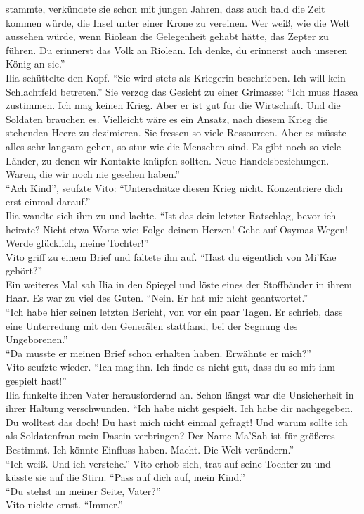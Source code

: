 stammte, verkündete sie schon mit jungen Jahren, dass auch bald die Zeit kommen würde, die Insel 
unter einer Krone zu vereinen. Wer weiß, wie die Welt aussehen würde, wenn Riolean die Gelegenheit 
gehabt hätte, das Zepter zu führen. Du erinnerst das Volk an Riolean. Ich denke, du erinnerst auch 
unseren König an sie.''\\
Ilia schüttelte den Kopf. ``Sie wird stets als Kriegerin beschrieben. Ich will kein Schlachtfeld 
betreten.'' Sie verzog das Gesicht zu einer Grimasse: ``Ich muss Hasea zustimmen. Ich mag keinen 
Krieg. Aber er ist gut für die Wirtschaft. Und die Soldaten brauchen es. Vielleicht wäre es ein 
Ansatz, nach diesem Krieg die stehenden Heere zu dezimieren. Sie fressen so viele Ressourcen. Aber 
es müsste alles sehr langsam gehen, so stur wie die Menschen sind. Es gibt noch so viele Länder, zu 
denen wir Kontakte knüpfen sollten. Neue Handelsbeziehungen. Waren, die wir noch nie gesehen 
haben.''\\
``Ach Kind'', seufzte Vito: ``Unterschätze diesen Krieg nicht. Konzentriere dich erst einmal 
darauf.''\\
Ilia wandte sich ihm zu und lachte. ``Ist das dein letzter Ratschlag, bevor ich heirate? Nicht 
etwa Worte wie: Folge deinem Herzen! Gehe auf Osymas Wegen! Werde glücklich, meine Tochter!''\\
Vito griff zu einem Brief und faltete ihn auf. ``Hast du eigentlich von Mi'Kae gehört?''\\
Ein weiteres Mal sah Ilia in den Spiegel und löste eines der Stoffbänder in ihrem Haar. 
Es war zu viel des Guten. ``Nein. Er hat mir nicht geantwortet.''\\
``Ich habe hier seinen letzten Bericht, von vor ein paar Tagen. Er schrieb, dass eine 
Unterredung mit den Generälen stattfand, bei der Segnung des Ungeborenen.''\\
``Da musste er meinen Brief schon erhalten haben. Erwähnte er mich?''\\
Vito seufzte wieder. ``Ich mag ihn. Ich finde es nicht gut, dass du so mit ihm gespielt hast!''\\
Ilia funkelte ihren Vater herausfordernd an. Schon längst war die Unsicherheit in ihrer Haltung 
verschwunden. ``Ich habe nicht gespielt. Ich habe dir nachgegeben. Du wolltest das doch! Du hast 
mich nicht einmal gefragt! Und warum sollte ich als Soldatenfrau mein Dasein verbringen? Der 
Name Ma'Sah ist für größeres Bestimmt. Ich könnte Einfluss haben. Macht. Die Welt verändern.''\\
``Ich weiß. Und ich verstehe.'' Vito erhob sich, trat auf seine Tochter zu und küsste sie auf die 
Stirn. ``Pass auf dich auf, mein Kind.''\\
``Du stehst an meiner Seite, Vater?''\\
Vito nickte ernst. ``Immer.''\\


